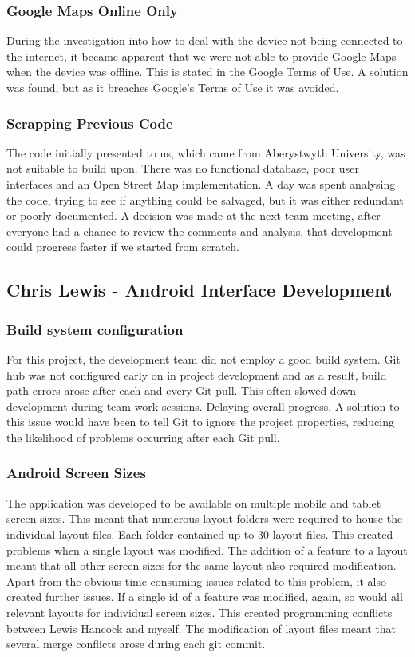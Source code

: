 \documentclass[11pt,a4paper]{report}
\begin{document}
\subsubsection{Google Maps Online Only}
During the investigation into how to deal with the device not being connected to the internet, it became apparent that we were not able to provide Google Maps when the device was offline. This is stated in the Google Terms of Use. A solution was found, but as it breaches Google's Terms of Use it was avoided.

\subsubsection{Scrapping Previous Code}
The code initially presented to us, which came from Aberystwyth University, was not suitable to build upon. There was no functional database, poor user interfaces and an Open Street Map implementation. A day was spent analysing the code, trying to see if anything could be salvaged, but it was either redundant or poorly documented. A decision was made at the next team meeting, after everyone had a chance to review the comments and analysis, that development could progress faster if we started from scratch.

\subsection{Chris Lewis - Android Interface Development}

\subsubsection{Build system configuration}

For this project, the development team did not employ a good build system. Git hub was not configured early on in project development and as a result, build path errors arose after each and every Git pull. This often slowed down development during team work sessions. Delaying overall progress. A solution to this issue would have been to tell Git to ignore the project properties, reducing the likelihood of problems occurring after each Git pull.

\subsubsection{Android Screen Sizes}

The application was developed to be available on multiple mobile and tablet screen sizes. This meant that numerous layout folders were required to house the individual layout files. Each folder contained up to 30 layout files. This created problems when a single layout was modified. The addition of a feature to a layout meant that all other screen sizes for the same layout also required modification. Apart from the obvious time consuming issues related to this problem, it also created further issues. If a single id of a feature was modified, again, so would all relevant layouts for individual screen sizes. This created programming conflicts between Lewis Hancock and myself. The modification of layout files meant that several merge conflicts arose during each git commit.\\
\end{document}
